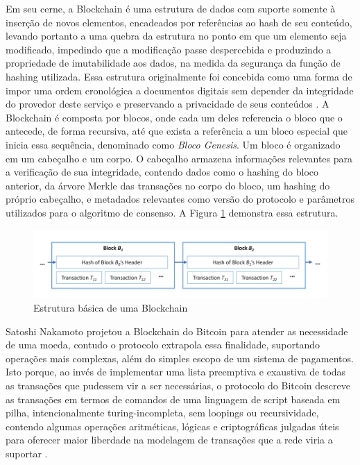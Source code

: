 \documentclass[a4paper,11pt]{article}
\begin{document}
Em seu cerne, a Blockchain é uma estrutura de dados com suporte somente à inserção de novos elementos, encadeados por referências ao hash de seu conteúdo, levando portanto a uma quebra da estrutura no ponto em que um elemento seja modificado, impedindo que a modificação passe despercebida e produzindo a propriedade de imutabilidade aos dados, na medida da segurança da função de hashing utilizada. %
Essa estrutura originalmente foi concebida como uma forma de impor uma ordem cronológica a documentos digitais sem depender da integridade do provedor deste serviço e preservando a privacidade de seus conteúdos \cite{Haber1991}.
A Blockchain é composta por blocos, onde cada um deles referencia o bloco que o antecede, de forma recursiva, até que exista a referência a um bloco especial que inicia essa sequência, denominado como \emph{Bloco Genesis}.
Um bloco é organizado em um cabeçalho e um corpo.
O cabeçalho armazena informações relevantes para a verificação de sua integridade, contendo dados como o hashing do bloco anterior, da árvore Merkle das transações no corpo do bloco, um hashing do próprio cabeçalho, e metadados relevantes como versão do protocolo e parâmetros utilizados para o algoritmo de consenso.
A Figura \ref{fig:blockchain} demonstra essa estrutura.

\begin{figure}[htp]
    \centering
    \includegraphics[width=\textwidth]{images/exemplo-de-blockchain.png}
    \caption{Estrutura básica de uma Blockchain}
    \label{fig:blockchain}
\end{figure}

Satoshi Nakamoto projetou a Blockchain do Bitcoin para atender as necessidade de uma moeda, contudo o protocolo extrapola essa finalidade, suportando operações mais complexas, além do simples escopo de um sistema de pagamentos.
Isto porque, ao invés de implementar uma lista preemptiva e exaustiva de todas as transações que pudessem vir a ser necessárias, o protocolo do Bitcoin descreve as transações em termos de comandos de uma linguagem de script baseada em pilha, intencionalmente turing-incompleta, sem loopings ou recursividade, contendo algumas operações aritméticas, lógicas e criptográficas julgadas úteis para oferecer maior liberdade na modelagem de transações que a rede viria a suportar \cite{Narayanan2016a}.
\end{document}

